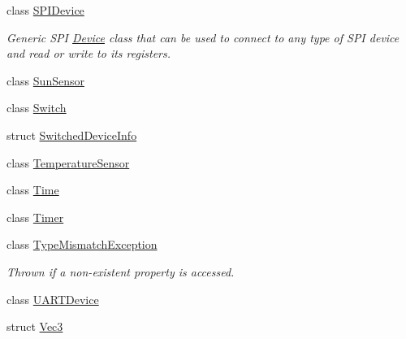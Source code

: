\begin{DoxyCompactItemize}
class \hyperlink{classcubesat_1_1SPIDevice}{S\+P\+I\+Device}
\begin{DoxyCompactList}\small\item\em Generic S\+PI \hyperlink{classcubesat_1_1Device}{Device} class that can be used to connect to any type of S\+PI device and read or write to its registers. \end{DoxyCompactList}\item 
class \hyperlink{classcubesat_1_1SunSensor}{Sun\+Sensor}
\item 
class \hyperlink{classcubesat_1_1Switch}{Switch}
\item 
struct \hyperlink{structcubesat_1_1SwitchedDeviceInfo}{Switched\+Device\+Info}
\item 
class \hyperlink{classcubesat_1_1TemperatureSensor}{Temperature\+Sensor}
\item 
class \hyperlink{classcubesat_1_1Time}{Time}
\item 
class \hyperlink{classcubesat_1_1Timer}{Timer}
\item 
class \hyperlink{classcubesat_1_1TypeMismatchException}{Type\+Mismatch\+Exception}
\begin{DoxyCompactList}\small\item\em Thrown if a non-\/existent property is accessed. \end{DoxyCompactList}\item 
class \hyperlink{classcubesat_1_1UARTDevice}{U\+A\+R\+T\+Device}
\item 
struct \hyperlink{structcubesat_1_1Vec3}{Vec3}
\end{DoxyCompactItemize}
